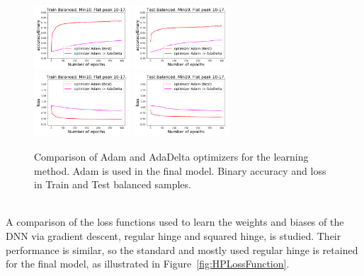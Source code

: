\begin{figure}[!htb]
\centering
\includegraphics[width=0.32\textwidth]{plots/plot_01_1_overlay_graph_accuracyBinary_Train_Optimizer.pdf}
\includegraphics[width=0.32\textwidth]{plots/plot_01_1_overlay_graph_accuracyBinary_Test_Optimizer.pdf}\\
\includegraphics[width=0.32\textwidth]{plots/plot_01_1_overlay_graph_loss_Train_Optimizer.pdf}
\includegraphics[width=0.32\textwidth]{plots/plot_01_1_overlay_graph_loss_Test_Optimizer.pdf}\\
\caption{Comparison of Adam and AdaDelta optimizers for the learning method. Adam is used in the final model. Binary accuracy and loss in Train and Test balanced samples.}
\label{fig:HPOptimizer}
\end{figure}

\ \\A comparison of the loss functions used to learn the weights and biases of the DNN via gradient descent, regular hinge and squared hinge, is studied. Their performance is similar, so the standard and mostly used regular hinge is retained for the final model, as illustrated in Figure~\ref{fig:HPLossFunction}.

